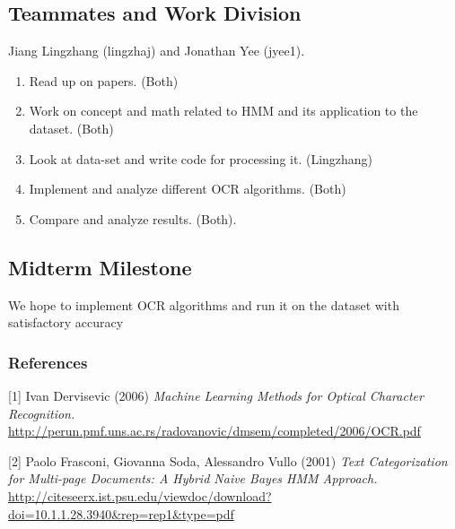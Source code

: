 \documentclass{article} %
\begin{document}
\subsection{Teammates and Work Division}
Jiang Lingzhang (lingzhaj) and Jonathan Yee (jyee1).
\begin{enumerate}
	\item Read up on papers. (Both)
	\item Work on concept and math related to HMM and its application to the dataset. (Both)
	\item Look at data-set and write code for processing it. (Lingzhang)
	\item Implement and analyze different OCR algorithms. (Both)
	\item Compare and analyze results. (Both).
\end{enumerate}

\subsection{Midterm Milestone}

We hope to implement OCR algorithms and run it on the dataset with satisfactory accuracy

\subsubsection*{References}

\small{
[1] Ivan Dervisevic (2006) {\it Machine Learning Methods for Optical Character Recognition.} \url{http://perun.pmf.uns.ac.rs/radovanovic/dmsem/completed/2006/OCR.pdf}

[2] Paolo Frasconi, Giovanna Soda, Alessandro Vullo (2001) {\it Text Categorization for Multi-page Documents: A Hybrid Naive Bayes HMM Approach.} \url{http://citeseerx.ist.psu.edu/viewdoc/download?doi=10.1.1.28.3940&rep=rep1&type=pdf}
}
\end{document}
